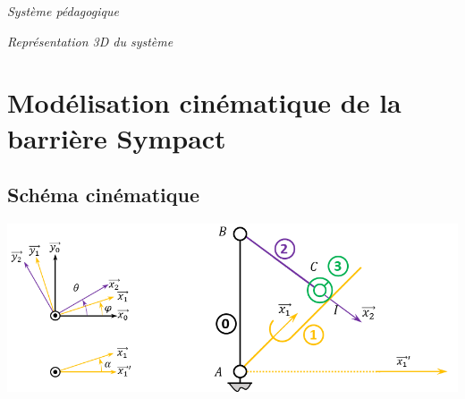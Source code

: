 \documentclass[10pt]{article}
\begin{document}

\begin{minipage}[b]{.3\linewidth}
\begin{center}

\textit{Système pédagogique}
\end{center}
\end{minipage} \hfill
\begin{minipage}[b]{.3\linewidth}
\begin{center}

\textit{Représentation 3D du système}
\end{center}
\end{minipage} \hfill
\begin{minipage}[b]{.3\linewidth}
\begin{center}

\end{center}
\end{minipage}



\setlength{\parskip}{0ex plus 0.2ex minus 0ex}
 \renewcommand{\contentsname}{}
 \renewcommand{\baselinestretch}{1}

\tableofcontents

 \renewcommand{\baselinestretch}{1.2}
\setlength{\parskip}{2ex plus 0.5ex minus 0.2ex}



\section{Modélisation cinématique de la barrière Sympact}
\subsection{Schéma cinématique}


\begin{center}
 \includegraphics[width=.95\textwidth]{images/fig_01}
\end{center}
\end{document}
